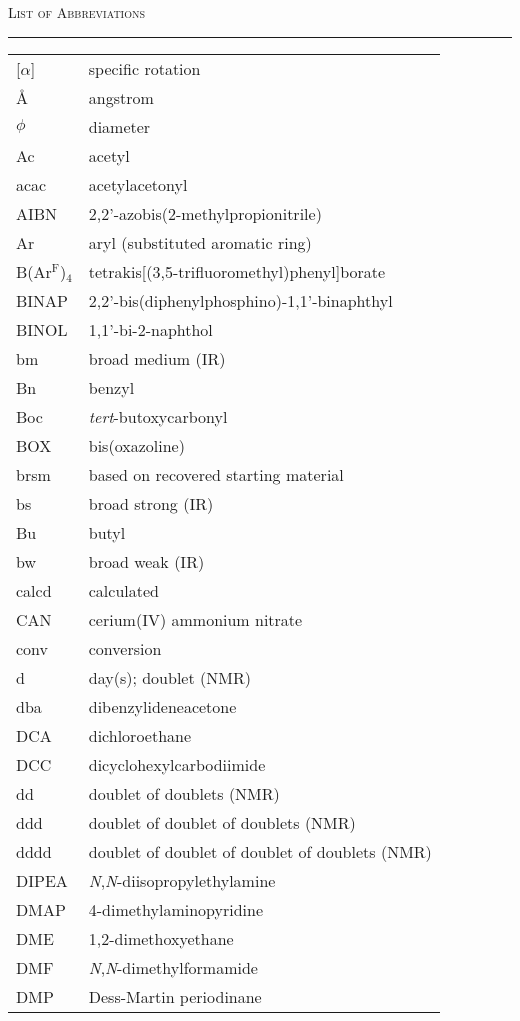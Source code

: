 \noindent\textsc{{\Large List of Abbreviations}}\\
\hrule
\doublespacing
\vspace{10pt}
{%
\begin{supertabular}{p{1.5in}l}
[$\alpha$] & specific rotation \\
\AA&angstrom \\
$\phi$&diameter\\
Ac&acetyl\\
acac&acetylacetonyl\\
AIBN&2,2'-azobis(2-methylpropionitrile)\\
Ar&aryl (substituted aromatic ring)\\
B(Ar$^\mathrm{F}$)$_4$&tetrakis[(3,5-trifluoromethyl)phenyl]borate\\
BINAP&2,2'-bis(diphenylphosphino)-1,1'-binaphthyl\\
BINOL&1,1'-bi-2-naphthol\\
bm &broad medium (IR)\\
Bn&benzyl\\
Boc&\textit{tert}-butoxycarbonyl\\
BOX&bis(oxazoline)\\
brsm & based on recovered starting material \\
bs&broad strong (IR)\\
Bu&butyl\\
bw&broad weak (IR)\\
calcd & calculated \\
CAN&cerium(IV) ammonium nitrate\\
conv & conversion \\
d&day(s); doublet (NMR)\\
dba&dibenzylideneacetone\\
DCA&dichloroethane\\
DCC&dicyclohexylcarbodiimide\\
dd&doublet of doublets (NMR)\\
ddd&doublet of doublet of doublets (NMR)\\
dddd&doublet of doublet of doublet of doublets (NMR)\\
DIPEA&\textit{N},\textit{N}-diisopropylethylamine\\
DMAP&4-dimethylaminopyridine\\
DME&1,2-dimethoxyethane\\
DMF&\textit{N},\textit{N}-dimethylformamide\\
DMP&Dess-Martin periodinane\\

\end{supertabular}}
